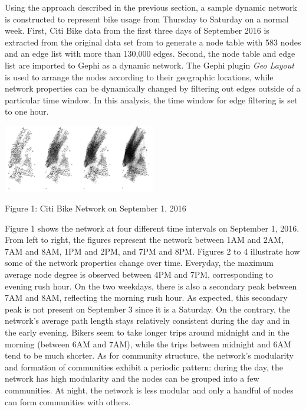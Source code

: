 \documentclass[times, 10pt,twocolumn]{article}
\begin{document}
Using the approach described in the previous section, a sample dynamic network is constructed to represent bike usage from Thursday to Saturday on a normal week. First, Citi Bike data from the first three days of September 2016 is extracted from the original data set from \cite{dataset} to generate a node table with 583 nodes and an edge list with more than 130,000 edges. Second, the node table and edge list are imported to Gephi as a dynamic network. The Gephi plugin \textit{Geo Layout} is used to arrange the nodes according to their geographic locations, while network properties can be dynamically changed by filtering out edges outside of a particular time window. In this analysis, the time window for edge filtering is set to one hour.\\

\centerline{\includegraphics[width=0.5\textwidth]{combined.jpg}}
\centerline{Figure 1: Citi Bike Network on September 1, 2016}

Figure 1 shows the network at four different time intervals on September 1, 2016. From left to right, the figures represent the network between 1AM and 2AM, 7AM and 8AM, 1PM and 2PM, and 7PM and 8PM. Figures 2 to 4 illustrate how some of the network properties change over time. Everyday, the maximum average node degree is observed between 4PM and 7PM, corresponding to evening rush hour. On the two weekdays, there is also a secondary peak between 7AM and 8AM, reflecting the morning rush hour. As expected, this secondary peak is not present on September 3 since it is a Saturday. On the contrary, the network's average path length stays relatively consistent during the day and in the early evening. Bikers seem to take longer trips around midnight and in the morning (between 6AM and 7AM), while the trips between midnight and 6AM tend to be much shorter. As for community structure, the network's modularity and formation of communities exhibit a periodic pattern: during the day, the network has high modularity and the nodes can be grouped into a few communities. At night, the network is less modular and only a handful of nodes can form communities with others.
\end{document}
